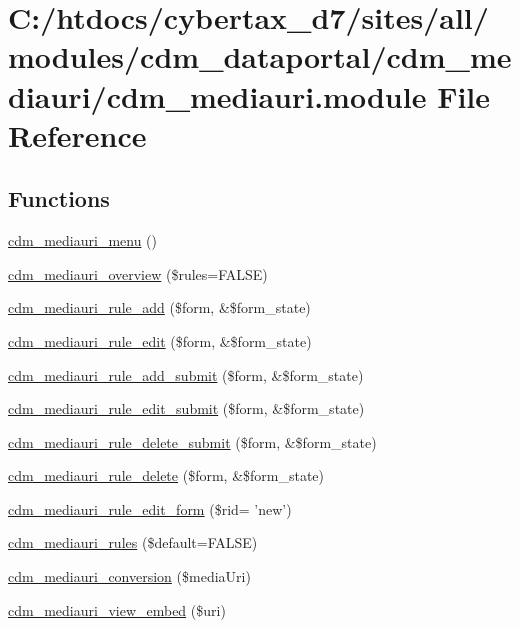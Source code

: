 \hypertarget{cdm__mediauri_8module}{\section{C\-:/htdocs/cybertax\-\_\-d7/sites/all/modules/cdm\-\_\-dataportal/cdm\-\_\-mediauri/cdm\-\_\-mediauri.module File Reference}
\label{cdm__mediauri_8module}
}
\subsection*{Functions}
\begin{DoxyCompactItemize}
\item 
\hyperlink{cdm__mediauri_8module_acb2704c6cfc4aa74c07646c4a42c3ee8}{cdm\-\_\-mediauri\-\_\-menu} ()
\item 
\hyperlink{cdm__mediauri_8module_a6b57a5309291876f466e77d2ca81338b}{cdm\-\_\-mediauri\-\_\-overview} (\$rules=F\-A\-L\-S\-E)
\item 
\hyperlink{cdm__mediauri_8module_a0f319c803786d6c24b3565726a7ed411}{cdm\-\_\-mediauri\-\_\-rule\-\_\-add} (\$form, \&\$form\-\_\-state)
\item 
\hyperlink{cdm__mediauri_8module_af92efba927fc0052a23bce6e1a61726e}{cdm\-\_\-mediauri\-\_\-rule\-\_\-edit} (\$form, \&\$form\-\_\-state)
\item 
\hyperlink{cdm__mediauri_8module_ab6d1d859993ec544bc33aad76e3b49a5}{cdm\-\_\-mediauri\-\_\-rule\-\_\-add\-\_\-submit} (\$form, \&\$form\-\_\-state)
\item 
\hyperlink{cdm__mediauri_8module_ad216e921909e40bc05b379685743b8fd}{cdm\-\_\-mediauri\-\_\-rule\-\_\-edit\-\_\-submit} (\$form, \&\$form\-\_\-state)
\item 
\hyperlink{cdm__mediauri_8module_a2da31aa84de56277247fa9affb3005cb}{cdm\-\_\-mediauri\-\_\-rule\-\_\-delete\-\_\-submit} (\$form, \&\$form\-\_\-state)
\item 
\hyperlink{cdm__mediauri_8module_a0c8ff8ae2e3fc28eba506d96f222b6d3}{cdm\-\_\-mediauri\-\_\-rule\-\_\-delete} (\$form, \&\$form\-\_\-state)
\item 
\hyperlink{cdm__mediauri_8module_a55e64c614658f5846e8655e9eae4ed86}{cdm\-\_\-mediauri\-\_\-rule\-\_\-edit\-\_\-form} (\$rid= 'new')
\item 
\hyperlink{cdm__mediauri_8module_a938c537e0b3e48f9fe83606b2a6a4800}{cdm\-\_\-mediauri\-\_\-rules} (\$default=F\-A\-L\-S\-E)
\item 
\hyperlink{cdm__mediauri_8module_a10d698d8ff170ae432a8ecf427834ae0}{cdm\-\_\-mediauri\-\_\-conversion} (\$media\-Uri)
\item 
\hyperlink{cdm__mediauri_8module_ad65acdec2eef70a324cbc0334223273f}{cdm\-\_\-mediauri\-\_\-view\-\_\-embed} (\$uri)
\end{DoxyCompactItemize}



